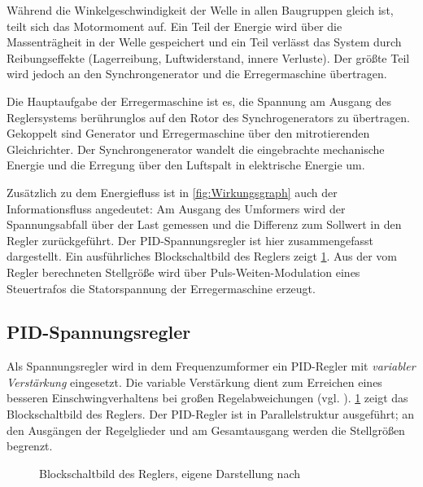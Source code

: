 Während die Winkelgeschwindigkeit der Welle in allen Baugruppen gleich ist, teilt sich das Motormoment auf. Ein Teil der Energie wird über die Massenträgheit in der Welle gespeichert und ein Teil verlässt das System durch Reibungseffekte (Lagerreibung, Luftwiderstand, innere Verluste). Der größte Teil wird jedoch an den Synchrongenerator und die Erregermaschine übertragen.

Die Hauptaufgabe der Erregermaschine ist es, die Spannung am Ausgang des Reglersystems berührunglos auf den Rotor des Synchrogenerators zu übertragen. Gekoppelt sind Generator und Erregermaschine über den mitrotierenden Gleichrichter. Der Synchrongenerator wandelt die eingebrachte mechanische Energie und die Erregung über den Luftspalt in elektrische Energie um.

Zusätzlich zu dem Energiefluss ist in \cref{fig:Wirkungsgraph} auch der Informationsfluss angedeutet: Am Ausgang des Umformers wird der Spannungsabfall über der Last gemessen und die Differenz zum Sollwert in den Regler zurückgeführt. Der PID-Spannungsregler ist hier zusammengefasst dargestellt. Ein ausführliches Blockschaltbild des Reglers zeigt \cref{fig:Blockschaltbild_Regler}. Aus der vom Regler berechneten Stellgröße wird über Puls-Weiten-Modulation eines Steuertrafos die Statorspannung der Erregermaschine erzeugt.

\subsection{PID-Spannungsregler}\label{sec:pid-spannungsregler}

Als Spannungsregler wird in dem Frequenzumformer ein PID-Regler mit \emph{variabler Verstärkung} eingesetzt. Die variable Verstärkung dient zum Erreichen eines besseren Einschwingverhaltens bei großen Regelabweichungen (vgl. \cite{pillerpowerssystemsDigitalerSpannungsreglerSoftwaredokumentation1997}). \cref{fig:Blockschaltbild_Regler} zeigt das Blockschaltbild des Reglers. Der PID-Regler ist in Parallelstruktur ausgeführt; an den Ausgängen der Regelglieder und am Gesamtausgang werden die Stellgrößen begrenzt. 

\begin{figure}
    \centering
    
    \caption{Blockschaltbild des Reglers, eigene Darstellung nach \cite{pillerpowersystemsGenBsb11APOJET1999}}
    \label{fig:Blockschaltbild_Regler}
\end{figure}

